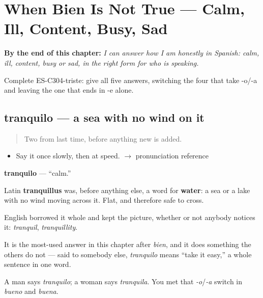 
\chapter{When Bien Is Not True --- Calm, Ill, Content, Busy, Sad}
\label{ch:como-estoy}

\begin{chapteropening}
\textbf{By the end of this chapter:} \emph{I can answer how I am honestly in Spanish: calm, ill, content, busy or sad, in the right form for who is speaking.}

Complete ES-C304-triste: give all five answers, switching the four that take -o/-a and leaving the one that ends in -e alone.
\end{chapteropening}

\section[tranquilo]{tranquilo — a sea with no wind on it}

\label{lesson:ES-C304-tranquilo}



\begin{quote}
Two from last time, before anything new is added.
\end{quote}

\begin{sounds}
\begin{itemize}
\raggedright
  \item Say it once slowly, then at speed. $\to$ pronunciation reference
\end{itemize}
\end{sounds}

\begin{cousinweb}
\textbf{tranquilo} — \textquotedblleft{}calm.\textquotedblright{}

Latin \textbf{tranquillus} was, before anything else, a word for \textbf{water}: a sea or a lake with no wind moving across it. Flat, and therefore safe to cross.

English borrowed it whole and kept the picture, whether or not anybody notices it: \emph{tranquil}, \emph{tranquillity}.

It is the most-used answer in this chapter after \emph{bien}, and it does something the others do not — said to somebody else, \emph{tranquilo} means \textquotedblleft{}take it easy,\textquotedblright{} a whole sentence in one word.

A man says \emph{tranquilo}; a woman says \emph{tranquila}. You met that \emph{-o}/\emph{-a} switch in \emph{bueno} and \emph{buena}.
\end{cousinweb}

